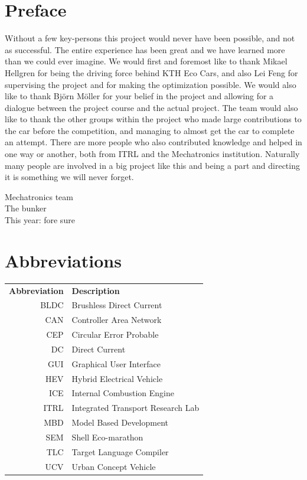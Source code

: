 \documentclass[a4paper, 12pt]{report}
\begin{document}
\chapter*{Preface}
Without a few key-persons this project would never have been possible, and not
as successful. The entire experience has been great and we have learned more
than we could ever imagine.  We would first and foremost like to thank Mikael Hellgren for
being the driving force behind KTH Eco Cars, and also Lei Feng for supervising the
project and for making the optimization possible. We
would also like to thank Björn Möller for your belief in the project and allowing for a dialogue between the project course and the actual project.
The team would also like to
thank the other groups within the project who made large contributions to the car before the
competition, and managing to almost get the car to complete an attempt.  There
are more people who also contributed knowledge and helped in one way or another,
both from ITRL and the Mechatronics institution.  Naturally many people are
involved in a big project like this and being a part and directing it is
something we will never forget.

\begin{flushright}Mechatronics team \\ The bunker \\This year: fore sure \end{flushright}

\clearpage
\setcounter{tocdepth}{1}
\tableofcontents

\chapter*{Abbreviations}
\noindent{}\begin{tabular}{r  l}
\textbf{Abbreviation} 	& \textbf{Description} \vspace{.5em} \\
BLDC	&Brushless Direct Current\\
CAN	&Controller Area Network\\
CEP     &Circular Error Probable\\
DC	&Direct Current\\
GUI     &Graphical User Interface\\
HEV     &Hybrid Electrical Vehicle\\
ICE 	&Internal Combustion Engine\\
ITRL    &Integrated Transport Research Lab\\
MBD     &Model Based Development\\
SEM	&Shell Eco-marathon\\
TLC	&Target Language Compiler\\
UCV     &Urban Concept Vehicle

\end{tabular}
\end{document}
